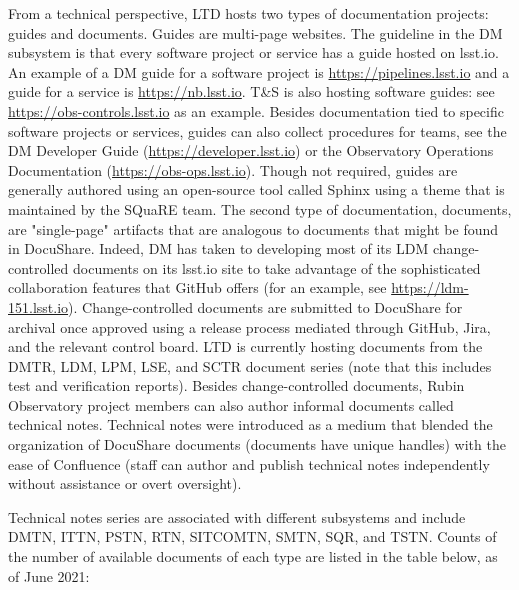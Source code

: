 From a technical perspective, LTD hosts two types of documentation projects: guides and documents. Guides are multi-page websites. The guideline in the DM subsystem is that every software project or service has a guide hosted on lsst.io. An example of a DM guide for a software project is \url{https://pipelines.lsst.io} and a guide for a service is \url{https://nb.lsst.io}. T\&S is also hosting software guides: see \url{https://obs-controls.lsst.io} as an example. Besides documentation tied to specific software projects or services, guides can also collect procedures for teams, see the DM Developer Guide (\url{https://developer.lsst.io}) or the Observatory Operations Documentation (\url{https://obs-ops.lsst.io}). Though not required, guides are generally authored using an open-source tool called Sphinx \citep{Sphinx-cite} using a theme that is maintained by the SQuaRE team. The second type of documentation, documents, are "single-page" artifacts that are analogous to documents that might be found in DocuShare. Indeed, DM has taken to developing most of its LDM change-controlled documents on its lsst.io site to take advantage of the sophisticated collaboration features that GitHub offers (for an example, see \url{https://ldm-151.lsst.io}). \citep{GitHub-cite} Change-controlled documents are submitted to DocuShare for archival once approved using a release process mediated through GitHub, Jira, and the relevant control board. LTD is currently hosting documents from the DMTR, LDM, LPM, LSE, and SCTR document series (note that this includes test and verification reports). Besides change-controlled documents, Rubin Observatory project members can also author informal documents called technical notes. Technical notes were introduced as a medium that blended the organization of DocuShare documents (documents have unique handles) with the ease of Confluence (staff can author and publish technical notes independently without assistance or overt oversight). 

Technical notes series are associated with different subsystems and include DMTN, ITTN, PSTN, RTN, SITCOMTN, SMTN, SQR, and TSTN. Counts of the number of available documents of each type are listed in the table below, as of June 2021:

